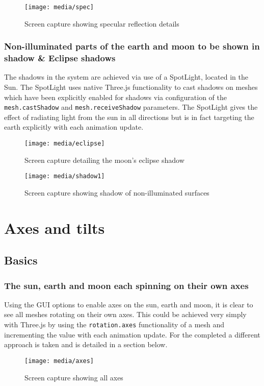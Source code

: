 \documentclass[titlepage]{article}
\begin{document}
\begin{figure}[h!]
                \centering
                \texttt{[image: media/spec]}
                \caption{Screen capture showing specular reflection details}
\end{figure}


\subsubsection{Non-illuminated parts of the earth and moon to be shown in shadow \& Eclipse shadows}
The shadows in the system are achieved via use of a SpotLight, located in the Sun. The SpotLight uses native Three.js functionality to cast shadows on meshes which have been explicitly enabled for shadows via configuration of the \texttt{mesh.castShadow} and \texttt{mesh.receiveShadow} parameters. The SpotLight gives the effect of radiating light from the sun in all directions but is in fact targeting the earth explicitly with each animation update. 


\begin{figure}[h!]
                \centering
                \texttt{[image: media/eclipse]}
                \caption{Screen capture detailing the moon's eclipse shadow}
\end{figure}

\begin{figure}[h!]
                \centering
                \texttt{[image: media/shadow1]}
                \caption{Screen capture showing shadow of non-illuminated surfaces}
\end{figure}
\medskip

\section{Axes and tilts}

\subsection{Basics}
\subsubsection{The sun, earth and moon each spinning on their own axes}
Using the GUI options to enable axes on the sun, earth and moon, it is clear to see all meshes rotating on their own axes. This could be achieved very simply with Three.js by using the \texttt{rotation.axes} functionality of a mesh and incrementing the value with each animation update. For the completed a different approach is taken and is detailed in a section below.
\begin{figure}[h!]
                \centering
                \texttt{[image: media/axes]}
                \caption{Screen capture showing all axes}
\end{figure}
\end{document}
